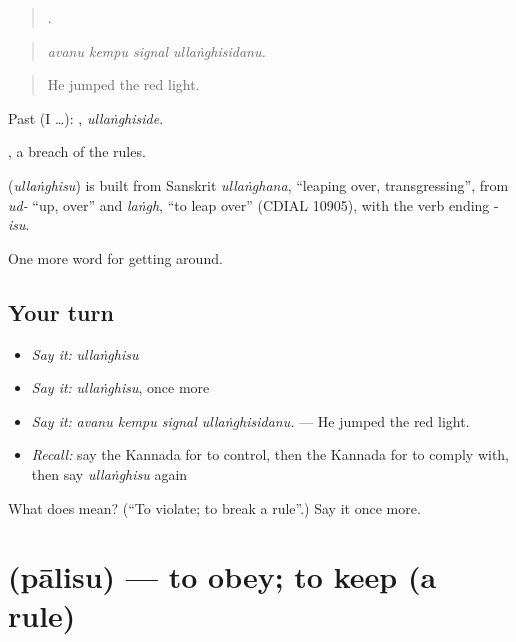 \begin{quote}
   .
\end{quote}

\begin{quote}
\emph{avanu kempu signal ullaṅghisidanu.}
\end{quote}

\begin{quote}
He jumped the red light.
\end{quote}

Past (I …): , \emph{ullaṅghiside}.

 , a breach of the rules.

\begin{cousinweb}
\textbf{} (\emph{ullaṅghisu}) is built from Sanskrit \emph{ullaṅghana}, \textquotedblleft{}leaping over, transgressing\textquotedblright{}, from \emph{ud-} \textquotedblleft{}up, over\textquotedblright{} and \emph{laṅgh}, \textquotedblleft{}to leap over\textquotedblright{} (CDIAL 10905), with the verb ending -\emph{isu}.
\end{cousinweb}

\begin{grammarlens}[title={What you've built}]
One more word for getting around.
\end{grammarlens}

\subsection*{Your turn}
\begin{itemize}
\raggedright
  \item \emph{Say it:} \emph{ullaṅghisu}
  \item \emph{Say it:} \emph{ullaṅghisu}, once more
  \item \emph{Say it:} \emph{avanu kempu signal ullaṅghisidanu.} — He jumped the red light.
  \item \emph{Recall:} say the Kannada for to control, then the Kannada for to comply with, then say \emph{ullaṅghisu} again
\end{itemize}

\begin{tcolorbox}[breakable,colback=teal!4,colframe=teal!35!black,title={Before you move on}]
What does  mean? (\textquotedblleft{}To violate; to break a rule\textquotedblright{}.) Say it once more.
\end{tcolorbox}
\section[\texorpdfstring{\kn{ಪಾಲಿಸು} (pālisu)}{ಪಾಲಿಸು (pālisu)}]{ (pālisu) — to obey; to keep (a rule)}


